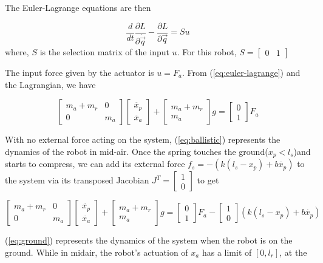 \documentclass[12pt, a4paper]{report}
\begin{document}
The Euler-Lagrange equations are then

\begin{equation}
	\frac{d}{dt}\frac{\partial L}{\partial \dot{\vec{q}}} - \frac{\partial L}{\partial \vec{q}} = Su
	\label{eq:euler-lagrange}
\end{equation}
where,
$S$ is the selection matrix of the input $u$. For this robot, $S = \begin{bmatrix}
0&1
\end{bmatrix}$\par 
The input force given by the actuator is $u = F_{a}$. From (\ref{eq:euler-lagrange}) and the Lagrangian, we have

\begin{equation}
\begin{bmatrix}
m_{a} + m_{r}&0\\
0 & m_{a}
\end{bmatrix}
\begin{bmatrix}
\ddot{x_{p}}\\
\ddot{x_{a}}
\end{bmatrix}
+\begin{bmatrix}
m_{a}+m_{r}\\m_{a}
\end{bmatrix}g =
\begin{bmatrix}
0\\1
\end{bmatrix}
F_{a}
\label{eq:ballistic}
\end{equation}

With no external force acting on the system, (\ref{eq:ballistic}) represents the dynamics of the robot in mid-air. Once the spring touches the ground($x_{p}<l_{s}$)and starts to compress, we can add its external force $f_{s} = -(k(l_{s}-x_{p})+b\dot{x_{p}})$ to the system via its transposed Jacobian $J^{T} = \begin{bmatrix}
1\\0
\end{bmatrix}$ to get

\begin{equation}
\begin{bmatrix}
m_{a} + m_{r}&0\\
0 & m_{a}
\end{bmatrix}
\begin{bmatrix}
\ddot{x_{p}}\\
\ddot{x_{a}}
\end{bmatrix}
+\begin{bmatrix}
m_{a}+m_{r}\\m_{a}
\end{bmatrix}g =
\begin{bmatrix}
0\\1
\end{bmatrix}
F_{a} - 
\begin{bmatrix}
1\\0
\end{bmatrix}
(k(l_{s}-x_{p})+b\dot{x_{p}})
\label{eq:ground}
\end{equation}

(\ref{eq:ground}) represents the dynamics of the system when the robot is on the ground. While in midair, the robot's actuation of $x_{a}$ has a limit of $[0, l_{r}]$, at the 
\end{document}
